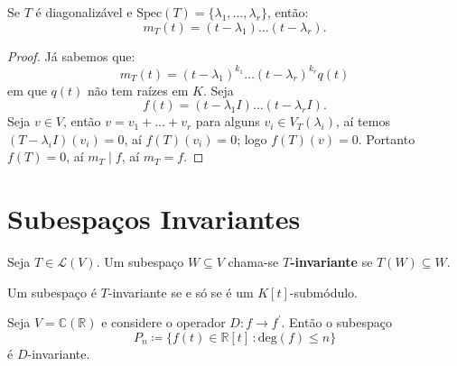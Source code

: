 \documentclass[11pt,twoside,a4paper]{book}
\begin{document}
\begin{corolario}\label{diagonal1}
Se $T$ é diagonalizável e $\mathrm{Spec}(T)=\{\lambda_1,\dots,\lambda_r\}$, então:
\[
m_T(t)=(t-\lambda_1)\dots(t-\lambda_r).
\]
\end{corolario}

\begin{proof}
Já sabemos que:
\[
m_T(t)=(t-\lambda_1)^{k_1}\dots(t-\lambda_r)^{k_r}q(t)
\]
em que $q(t)$ não tem raízes em $K$. Seja
\[
f(t)=(t-\lambda_1I)\dots(t-\lambda_rI).
\]
Seja $v\in V$, então $v=v_1+\dots+v_r$ para alguns $v_i\in V_T(\lambda_i)$, aí temos $(T-\lambda_iI)(v_i)=0$, aí $f(T)(v_i)=0$; logo $f(T)(v)=0$. Portanto $f(T)=0$, aí $m_T\mid f$, aí $m_T=f$.
\end{proof}

\section{Subespaços Invariantes}

\begin{definicao}
Seja $T\in\mathcal{L}(V)$. Um subespaço $W\subseteq V$ chama-se \textbf{$T$-invariante} se $T(W)\subseteq W$.
\end{definicao}

\begin{observacao}
Um subespaço é $T$-invariante se e só se é um $K[t]$-submódulo.
\end{observacao}
\begin{exemplo}
Seja \(V=\mathbb{C}(\mathbb{R})\) e considere o operador \(D\colon f\to
f^\prime\). Então o subespaço\[P_n\coloneqq\{f(t)\in\mathbb{R}[t]\,\colon
\text{deg}(f)\leq n\}\] é \(D\)-invariante. 
\end{exemplo}
\end{document}
